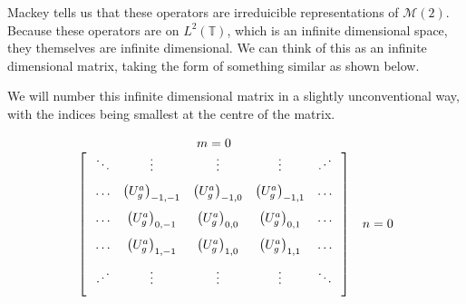 \documentclass{article}
\begin{document}
Mackey tells us that these operators are irreduicible representations of $\mathcal{M}(2)$. Because these operators are on $L^{2}(\mathbb{T})$, which is an infinite dimensional space, they themselves are infinite dimensional. We can think of this as an infinite dimensional matrix, taking the form of something similar as shown below.

\begin{remark}
    We will number this infinite dimensional matrix in a slightly unconventional way, with the indices being smallest at the centre of the matrix.
\end{remark}

\[%
    \begin{matrix}
        m=0 &  \\
        \begin{bmatrix} 
            \hspace{0.25cm} \ddots  & \vdots                         & \vdots                        & \vdots                        & \iddots \hspace{0.25cm} \vspace{0.25cm} \\
            \hspace{0.25cm} \ldots  & \left(U^{a}_{g}\right)_{-1,-1} & \left(U^{a}_{g}\right)_{-1,0} & \left(U^{a}_{g}\right)_{-1,1} & \ldots  \hspace{0.25cm} \vspace{0.25cm} \\
            \hspace{0.25cm} \ldots  & \left(U^{a}_{g}\right)_{0,-1}  & \left(U^{a}_{g}\right)_{0,0}  & \left(U^{a}_{g}\right)_{0,1}  & \ldots  \hspace{0.25cm} \vspace{0.25cm} \\
            \hspace{0.25cm} \ldots  & \left(U^{a}_{g}\right)_{1,-1}  & \left(U^{a}_{g}\right)_{1,0}  & \left(U^{a}_{g}\right)_{1,1}  & \ldots  \hspace{0.25cm} \vspace{0.25cm} \\
            \hspace{0.25cm} \iddots & \vdots                         & \vdots                        & \vdots                        & \ddots  \hspace{0.25cm} \vspace{0.25cm} \\
        \end{bmatrix}
            &  n=0
             \\
    \end{matrix}
\]%
\end{document}
